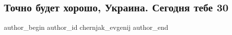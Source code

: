  
 
 
 
 
 
\subsection{Точно будет хорошо, Украина. Сегодня тебе 30}
\label{sec:24_08_2021.fb.chernjak_evgenij.1.tochno_budet_horosho_ukraina}
 
\ifcmt
 author_begin
   author_id chernjak_evgenij
 author_end
\fi

